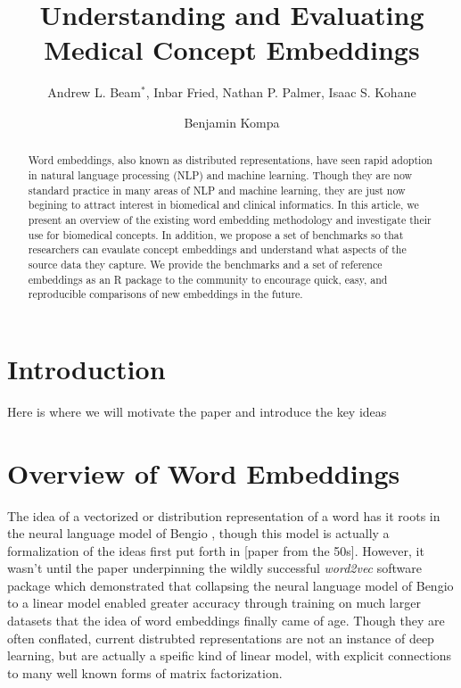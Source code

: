 \documentclass{ws-procs11x85}
\begin{document}
\title{Understanding and Evaluating Medical Concept Embeddings}

\author{Andrew L. Beam$^*$, Inbar Fried, Nathan P. Palmer, Isaac S. Kohane}

\address{Department of Biomedical Informatics, Harvard Medical School,\\
Boston, MA, 02115, USA\\
$^*$E-mail: Andrew\_Beam@hms.harvard.edu\\
www.university\_name.edu}

\author{Benjamin Kompa}

\address{University of North Carolina, Chapel Hill,\\
Chapel Hill, NC, 27514, USA\\
E-mail: kompa@live.unc.edu}

\begin{abstract}
Word embeddings, also known as distributed representations, have seen rapid adoption in natural language processing (NLP) and machine learning. Though they are now standard practice in many areas of NLP and machine learning, they are just now begining to attract interest in biomedical and clinical informatics. In this article, we present an overview of the existing word embedding methodology and investigate their use for biomedical concepts. In addition, we propose a set of benchmarks so that researchers can evaulate concept embeddings and understand what aspects of the source data they capture. We provide the benchmarks and a set of reference embeddings as an R package to the community to encourage quick, easy, and reproducible comparisons of new embeddings in the future.
\end{abstract}


\bodymatter

\section{Introduction}\label{aba:intro}
Here is where we will motivate the paper and introduce the key ideas

\section{Overview of Word Embeddings}\label{aba:intro}
The idea of a vectorized or distribution representation of a word has it roots in the neural language model of Bengio \cite{bengio2003neural}, though this model is actually a formalization of the ideas first put forth in [paper from the 50s]. However, it wasn't until the paper\cite{mikolov2013distributed} underpinning the wildly successful \emph{word2vec} software package which demonstrated that collapsing the neural language model of Bengio\cite{bengio2003neural} to a linear model enabled greater accuracy through training on much larger datasets that the idea of word embeddings finally came of age. Though they are often conflated, current distrubted representations are not an instance of deep learning, but are actually a speific kind of linear model, with explicit connections to many well known forms of matrix factorization.
\end{document}
